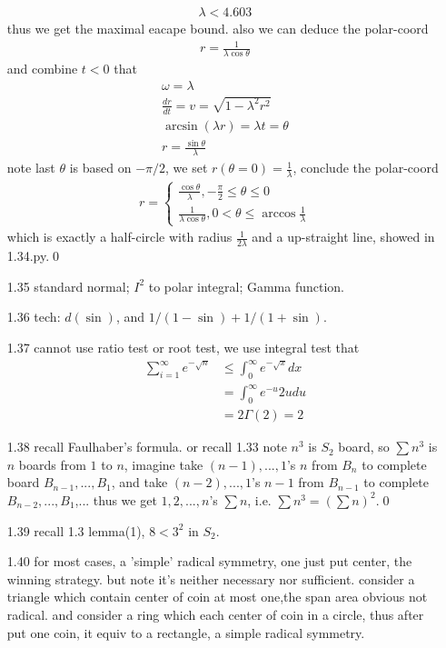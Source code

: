 \documentclass[paper=a4, fontsize=11pt]{scrartcl} %
\numberwithin{equation}{section} %
\numberwithin{figure}{section} %
\numberwithin{table}{section} %
\begin{document}
\begin{itemize}
\begin{align}
		\lambda < 4.603
	\end{align}
	thus we get the maximal eacape bound. also we can deduce the polar-coord 
	\begin{align}
		r = \frac{1}{\lambda \cos\theta}
	\end{align}
	and combine $t<0$ that
	\begin{align}
		\omega = \lambda\\
		\frac{dr}{dt} = v = \sqrt{1-\lambda^2r^2}\\
		\arcsin (\lambda r) = \lambda t = \theta \\
		r = \frac{\sin\theta}{\lambda}
	\end{align}
	note last $\theta$ is based on $-\pi/2$, we set $r(\theta=0)=\frac{1}{\lambda}$, conclude the polar-coord
	\begin{align}
		r = \begin{cases} \frac{\cos\theta}{\lambda}, -\frac{\pi}{2}\leq \theta\leq 0 \\
			\frac{1}{\lambda \cos\theta}, 0<\theta\leq \arccos \frac{1}{\lambda}\end{cases}
	\end{align}
	which is exactly a half-circle with radius $\frac{1}{2\lambda}$ and a up-straight line, showed in 1.34.py.\qed
	\item[1.35] standard normal; $I^2$ to polar integral; Gamma function.
	\item[1.36] tech: $d(\sin )$, and $1/(1-\sin) + 1/(1+\sin)$.
	\item[1.37] cannot use ratio test or root test, we use integral test that
	\begin{align}
		\sum_{i=1}^\infty e^{-\sqrt{n}} &\leq \int_0^\infty e^{-\sqrt{x}}dx\\
			&= \int_0^\infty e^{-u}2udu\\
			&= 2 \Gamma(2)=2
	\end{align}
	\item[1.38] recall Faulhaber's formula. or recall 1.33 note $n^3$ is $S_2$ board, so $\sum n^3$ is $n$ boards from $1$ to $n$, imagine take $(n-1),...,1$'s $n$ from $B_n$ to complete board $B_{n-1},...,B_1$, and take $(n-2),...,1$'s $n-1$ from $B_{n-1}$ to complete $B_{n-2},...,B_1$,... thus we get $1,2,...,n$'s $\sum n$, i.e. $\sum n^3 = (\sum n)^2$.\qed
	\item[1.39] recall 1.3 lemma(1), $8<3^2$ in $S_2$.
	\item[1.40] for most cases, a 'simple' radical symmetry, one just put center, the winning strategy. but note it's neither necessary nor sufficient. consider a triangle which contain center of coin at most one,the span area obvious not radical. and consider a ring which each center of coin in a circle, thus after put one coin, it equiv to a rectangle, a simple radical symmetry.
\end{itemize}
\end{document}
